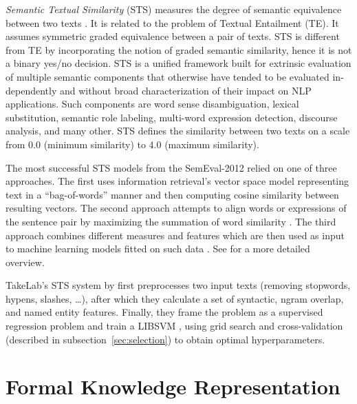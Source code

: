 \textit{Semantic  Textual  Similarity}  (STS)  measures the  degree  of  semantic
equivalence  between two texts \citep{agirre2012semeval}. It is related to the problem
of Textual Entailment (TE). It assumes symmetric graded equivalence between
a pair of texts. STS is different from TE by incorporating the notion of 
graded semantic similarity, hence it is not a binary yes/no decision. 
STS is a unified framework built for 
extrinsic evaluation of multiple semantic components that otherwise
have tended to be evaluated in-dependently  and  without  broad
characterization  of their impact on NLP applications. 
Such components are word  sense  disambiguation, lexical  substitution,  semantic
role  labeling,  multi-word  expression  detection, discourse analysis, and 
many other. STS defines the similarity between two texts on a scale from 
0.0 (minimum similarity) to 4.0 (maximum similarity).

The most successful STS models from the SemEval-2012 relied on 
one of three approaches. The first uses information retrieval's 
vector space model \citep{meadow1992text} representing text in a 
``bag-of-words'' manner and then computing cosine similarity between 
resulting vectors. The second approach attempts to align words or expressions of
the sentence pair by maximizing the summation of word similarity \citep{mihalcea2006corpus}.
The third approach combines different measures and features which are then 
used as input to machine learning models fitted on such data 
\citep{vsaric2012takelab}. See \citep{han2013umbc_ebiquity}
for a more detailed overview. 

TakeLab's STS system by \citet{vsaric2012takelab} first preprocesses two input
texts (removing stopwords, hypens, slashes, \dots), after which they calculate
a set of syntactic, ngram overlap, and named entity features.  Finally, they
frame the problem as a supervised regression problem and train a LIBSVM
\citep{chang2011libsvm}, using grid search and cross-validation (described in
subsection~\ref{sec:selection}) to obtain optimal hyperparameters.

\section{Formal Knowledge Representation}
\label{sec:knowledge_representation}

